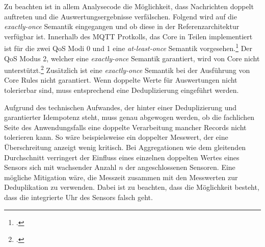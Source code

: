 Zu beachten ist in allem Analysecode die Möglichkeit, dass Nachrichten doppelt auftreten und die Auswertungsergebnisse verfälschen. Folgend wird auf die \textit{exactly-once} Semantik eingegangen und ob diese in der Referenzarchitektur verfügbar ist.
Innerhalb des MQTT Protkolls, das \AWSIOT{} Core in Teilen implementiert ist für die zwei  \ac{QoS} Modi 0 und 1 eine \textit{at-least-once} Semantik vorgesehen.\footcite[Vgl. auch im Folgenden][]{OASISOpenConsortium.2014} Der \ac{QoS} Modus 2, welcher eine \textit{exactly-once} Semantik garantiert, wird von \AWSIOT{} Core nicht unterstützt.\footcite[Vgl.][]{AmazonWebServicesInc..o.J.bd} Zusätzlich ist eine \textit{exactly-once} Semantik bei der Ausführung von \AWSIOT{} Core Rules nicht garantiert. Wenn doppelte Werte für Auswertungen nicht tolerierbar sind, muss entsprechend eine Deduplizierung eingeführt werden. 

Aufgrund des technischen Aufwandes, der hinter einer Deduplizierung und garantierter Idempotenz steht, muss genau abgewogen werden, ob die fachlichen Seite des Anwendungsfalls eine doppelte Verarbeitung mancher Records nicht tolerieren kann. So wäre beispielsweise ein doppelter Messwert, der eine Überschreitung anzeigt wenig kritisch. Bei Aggregationen wie dem gleitenden Durchschnitt verringert der Einfluss eines einzelnen doppelten Wertes eines Sensors sich mit wachsender Anzahl $n$ der angeschlossenen Sensoren. Eine mögliche Mitigation wäre, die Messzeit zusammen mit den Messwerten zur Deduplikation zu verwenden. Dabei ist zu beachten, dass die Möglichkeit besteht, dass die integrierte Uhr des Sensors falsch geht.
